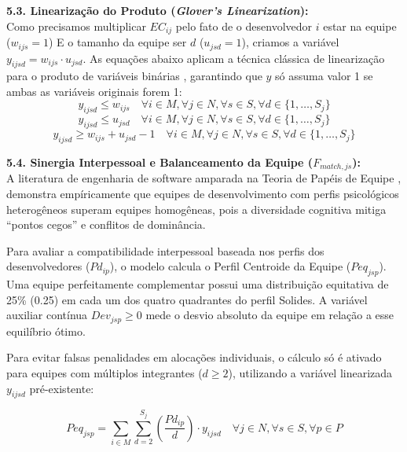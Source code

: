 \documentclass[a4paper,11pt]{article}
\begin{document}
\vspace{0.2cm}
\noindent\textbf{5.3. Linearização do Produto (\textit{Glover's Linearization}):} \\
Como precisamos multiplicar $EC_{ij}$ pelo fato de o desenvolvedor $i$ estar na equipe ($w_{ijs}=1$) E o tamanho da equipe ser $d$ ($u_{jsd}=1$), criamos a variável $y_{ijsd} = w_{ijs} \cdot u_{jsd}$. As equações abaixo aplicam a técnica clássica de linearização para o produto de variáveis binárias \citep{glover1975, watters1967}, garantindo que $y$ só assuma valor 1 se ambas as variáveis originais forem 1:
\begin{equation}
    y_{ijsd} \le w_{ijs} \quad \forall i \in M, \forall j \in N, \forall s \in S, \forall d \in \{1, \dots, S_j\}
\end{equation}
\begin{equation}
    y_{ijsd} \le u_{jsd} \quad \forall i \in M, \forall j \in N, \forall s \in S, \forall d \in \{1, \dots, S_j\}
\end{equation}
\begin{equation}
    y_{ijsd} \ge w_{ijs} + u_{jsd} - 1 \quad \forall i \in M, \forall j \in N, \forall s \in S, \forall d \in \{1, \dots, S_j\}
\end{equation}

\vspace{0.2cm}
\noindent\textbf{5.4. Sinergia Interpessoal e Balanceamento da Equipe ($F_{match, js}$):} \\
A literatura de engenharia de software \citep{gorla2004, acuna2006} amparada na Teoria de Papéis de Equipe \citep{belbin1993}, demonstra empíricamente que equipes de desenvolvimento com perfis psicológicos heterogêneos superam equipes homogêneas, pois a diversidade cognitiva mitiga ``pontos cegos'' e conflitos de dominância.

Para avaliar a compatibilidade interpessoal baseada nos perfis dos desenvolvedores ($Pd_{ip}$), o modelo calcula o Perfil Centroide da Equipe ($Peq_{jsp}$). Uma equipe perfeitamente complementar possui uma distribuição equitativa de 25\% (0.25) em cada um dos quatro quadrantes do perfil Solides. A variável auxiliar contínua $Dev_{jsp} \ge 0$ mede o desvio absoluto da equipe em relação a esse equilíbrio ótimo.

Para evitar falsas penalidades em alocações individuais, o cálculo só é ativado para equipes com múltiplos integrantes ($d \ge 2$), utilizando a variável linearizada $y_{ijsd}$ pré-existente:

\begin{equation}
    Peq_{jsp} = \sum_{i \in M} \sum_{d=2}^{S_j} \left( \frac{Pd_{ip}}{d} \right) \cdot y_{ijsd} \quad \forall j \in N, \forall s \in S, \forall p \in P
\end{equation}
\end{document}
